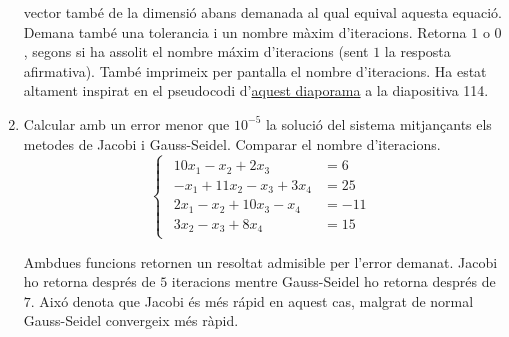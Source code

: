\documentclass[a4paper, 12pt]{article}
\begin{document}
\begin{exercici}
\begin{enumerate}[label=\alph*)]
\begin{solucio}
                vector també de la dimensió abans demanada al qual equival aquesta equació. Demana
                també una tolerancia i un nombre màxim d'iteracions. Retorna $1$ o $0$, segons si
                ha assolit el nombre máxim d'iteracions (sent $1$ la resposta afirmativa). També
                imprimeix per pantalla el nombre d'iteracions. Ha estat altament inspirat en el
                pseudocodi d'\href{https://e-aules.uab.cat/2023-24/pluginfile.php/705245/mod_resource/content/1/CalcNumMathCAD-LinAlg.pdf}{aquest diaporama} 
                a la diapositiva 114.
            \end{solucio}
            \item Calcular amb un error menor que $10^{-5}$ la solució del sistema mitjançants els
            metodes de Jacobi i Gauss-Seidel. Comparar el nombre d'iteracions.
            \begin{displaymath}
                \begin{cases}
                    \begin{split}
                        10x_1-x_2+2x_3 &= 6\\
                        -x_1+11x_2-x_3+3x_4 &= 25\\
                        2x_1-x_2+10x_3-x_4 &= -11\\
                        3x_2-x_3+8x_4 &= 15
                    \end{split}
                \end{cases}
            \end{displaymath}
            \begin{solucio}
                Ambdues funcions retornen un resoltat admisible per l'error demanat. Jacobi ho
                retorna després de $5$ iteracions mentre Gauss-Seidel ho retorna després de $7$.
                Aixó denota que Jacobi és més rápid en aquest cas, malgrat de normal Gauss-Seidel
                convergeix més ràpid.
            \end{solucio}
        \end{enumerate}
    \end{exercici}
\end{document}
